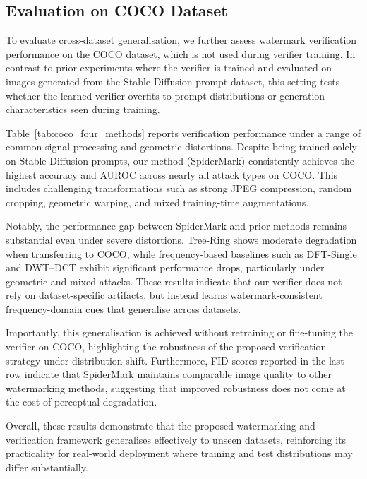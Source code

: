 \subsection{Evaluation on COCO Dataset}

To evaluate cross-dataset generalisation, we further assess watermark verification performance on the COCO dataset, which is not used during verifier training. In contrast to prior experiments where the verifier is trained and evaluated on images generated from the Stable Diffusion prompt dataset, this setting tests whether the learned verifier overfits to prompt distributions or generation characteristics seen during training.

Table~\ref{tab:coco_four_methods} reports verification performance under a range of common signal-processing and geometric distortions. Despite being trained solely on Stable Diffusion prompts, our method (SpiderMark) consistently achieves the highest accuracy and AUROC across nearly all attack types on COCO. This includes challenging transformations such as strong JPEG compression, random cropping, geometric warping, and mixed training-time augmentations.

Notably, the performance gap between SpiderMark and prior methods remains substantial even under severe distortions. Tree-Ring shows moderate degradation when transferring to COCO, while frequency-based baselines such as DFT-Single and DWT--DCT exhibit significant performance drops, particularly under geometric and mixed attacks. These results indicate that our verifier does not rely on dataset-specific artifacts, but instead learns watermark-consistent frequency-domain cues that generalise across datasets.

Importantly, this generalisation is achieved without retraining or fine-tuning the verifier on COCO, highlighting the robustness of the proposed verification strategy under distribution shift. Furthermore, FID scores reported in the last row indicate that SpiderMark maintains comparable image quality to other watermarking methods, suggesting that improved robustness does not come at the cost of perceptual degradation.

Overall, these results demonstrate that the proposed watermarking and verification framework generalises effectively to unseen datasets, reinforcing its practicality for real-world deployment where training and test distributions may differ substantially.


